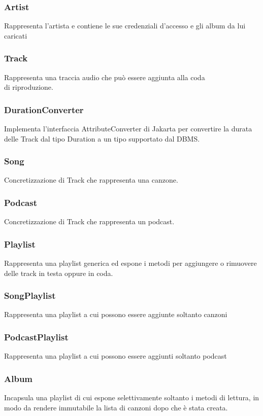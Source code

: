\documentclass{article}
\begin{document}
  \subsubsection{Artist}
  Rappresenta l'artista e contiene le sue credenziali d'accesso e gli album da lui caricati
  \subsubsection{Track}
  Rappresenta una traccia audio che può essere aggiunta alla coda\\ di riproduzione.

  \subsubsection{DurationConverter}
  Implementa l'interfaccia AttributeConverter di Jakarta per convertire la durata delle Track dal tipo Duration a un tipo supportato dal DBMS.
  \subsubsection{Song}
  Concretizzazione di Track che rappresenta una canzone.
  \subsubsection{Podcast}
  Concretizzazione di Track che rappresenta un podcast.
  \subsubsection{Playlist}
  Rappresenta una playlist generica ed espone i metodi per aggiungere o rimuovere\\ delle track in testa oppure in coda.

  \subsubsection{SongPlaylist}
  Rappresenta una playlist a cui possono essere aggiunte soltanto canzoni

  \subsubsection{PodcastPlaylist}
  Rappresenta una playlist a cui possono essere aggiunti soltanto podcast
  \subsubsection{Album}
  Incapsula una playlist di cui espone selettivamente soltanto i metodi di lettura, in modo da rendere immutabile la lista di canzoni dopo che è stata creata.
\end{document}
